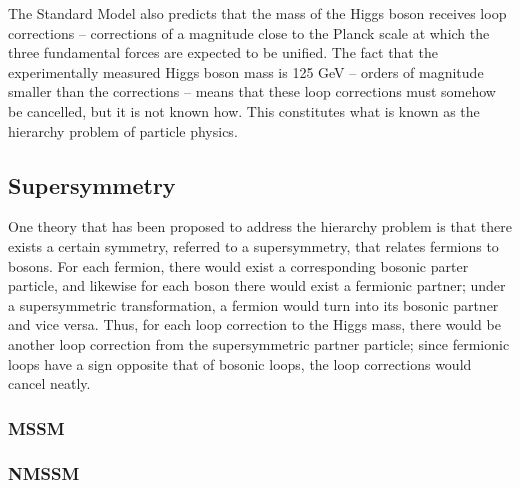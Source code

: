 The Standard Model also predicts that the mass of the Higgs boson receives loop corrections -- corrections of a magnitude close to the Planck scale at which the three fundamental forces are expected to be unified. The fact that the experimentally measured Higgs boson mass is 125 GeV -- orders of magnitude smaller than the corrections -- means that these loop corrections must somehow be cancelled, but it is not known how. This constitutes what is known as the hierarchy problem of particle physics.

\subsection{Supersymmetry}

One theory that has been proposed to address the hierarchy problem is that there exists a certain symmetry, referred to a supersymmetry, that relates fermions to bosons. For each fermion, there would exist a corresponding bosonic parter particle, and likewise for each boson there would exist a fermionic partner; under a supersymmetric transformation, a fermion would turn into its bosonic partner and vice versa. Thus, for each loop correction to the Higgs mass, there would be another loop correction from the supersymmetric partner particle; since fermionic loops have a sign opposite that of bosonic loops, the loop corrections would cancel neatly.

\subsubsection{MSSM}

\subsubsection{NMSSM}
